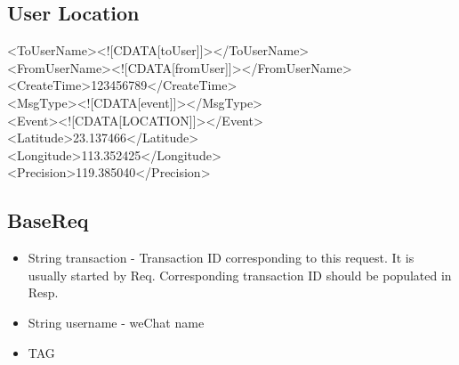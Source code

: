 \documentclass{article}
\begin{document}
\subsection{User Location}

<ToUserName><![CDATA[toUser]]></ToUserName>\\
<FromUserName><![CDATA[fromUser]]></FromUserName>\\
<CreateTime>123456789</CreateTime>\\
<MsgType><![CDATA[event]]></MsgType>\\
<Event><![CDATA[LOCATION]]></Event>\\
<Latitude>23.137466</Latitude>\\
<Longitude>113.352425</Longitude>\\
<Precision>119.385040</Precision>\\

\subsection{BaseReq}
\begin{itemize}
	\item String transaction - Transaction ID corresponding to this request. It is usually started by Req. Corresponding transaction ID should be populated in Resp. 
	\item String username - weChat name
	\item TAG
\end{itemize}

	
\end{document}
